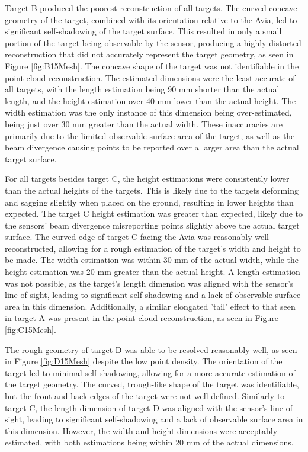 Target B produced the poorest reconstruction of all targets. The curved concave geometry of the target, combined with its orientation relative to the Avia, led to significant self-shadowing of the target surface. This resulted in only a small portion of the target being observable by the sensor, producing a highly distorted reconstruction that did not accurately represent the target geometry, as seen in Figure \ref{fig:B15Mesh}. The concave shape of the target was not identifiable in the point cloud reconstruction. The estimated dimensions were the least accurate of all targets, with the length estimation being 90 mm shorter than the actual length, and the height estimation over 40 mm lower than the actual height. The width estimation was the only instance of this dimension being over-estimated, being just over 30 mm greater than the actual width. These inaccuracies are primarily due to the limited observable surface area of the target, as well as the beam divergence causing points to be reported over a larger area than the actual target surface.

For all targets besides target C, the height estimations were consistently lower than the actual heights of the targets. This is likely due to the targets deforming and sagging slightly when placed on the ground, resulting in lower heights than expected. The target C height estimation was greater than expected, likely due to the sensors' beam divergence misreporting points slightly above the actual target surface. The curved edge of target C facing the Avia was reasonably well reconstructed, allowing for a rough estimation of the target's width and height to be made. The width estimation was within 30 mm of the actual width, while the height estimation was 20 mm greater than the actual height. A length estimation was not possible, as the target's length dimension was aligned with the sensor's line of sight, leading to significant self-shadowing and a lack of observable surface area in this dimension. Additionally, a similar elongated 'tail' effect to that seen in target A was present in the point cloud reconstruction, as seen in Figure \ref{fig:C15Mesh}.

The rough geometry of target D was able to be resolved reasonably well, as seen in Figure \ref{fig:D15Mesh} despite the low point density. The orientation of the target led to minimal self-shadowing, allowing for a more accurate estimation of the target geometry. The curved, trough-like shape of the target was identifiable, but the front and back edges of the target were not well-defined. Similarly to target C, the length dimension of target D was aligned with the sensor's line of sight, leading to significant self-shadowing and a lack of observable surface area in this dimension. However, the width and height dimensions were acceptably estimated, with both estimations being within 20 mm of the actual dimensions.

